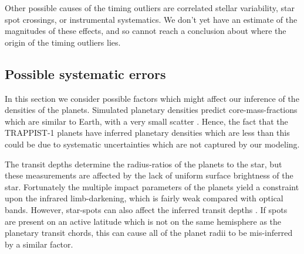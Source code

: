 \documentclass[twocolumn]{aastex63}
\begin{document}
Other possible causes of the timing outliers are correlated stellar variability, star spot crossings, or instrumental systematics.  We don't yet have an estimate of the magnitudes of these effects, and so cannot reach a conclusion about where the origin of the timing outliers lies.





\subsection{Possible systematic errors}

In this section we consider possible factors which might affect our
inference of the densities of the planets.  Simulated planetary
densities predict core-mass-fractions which are similar to 
Earth, with a very small scatter \citep{Scora2020}.  Hence, the
fact that the TRAPPIST-1 planets have inferred planetary densities
which are less than this could be due to systematic uncertainties
which are not captured by our modeling.

The transit depths
determine the radius-ratios of the planets to the star, but these
measurements are affected by the lack of uniform surface brightness
of the star.  Fortunately the multiple impact parameters of the
planets yield a constraint upon the infrared limb-darkening, which
is fairly weak compared with optical bands.  However, star-spots
can also affect the inferred transit depths \citep{Rackham2018,
Kipping2012b}.  If spots are present on an active latitude
which is not on the same hemisphere as the planetary transit chords,
this can cause all of the planet radii to be mis-inferred by a similar
factor.
\end{document}
